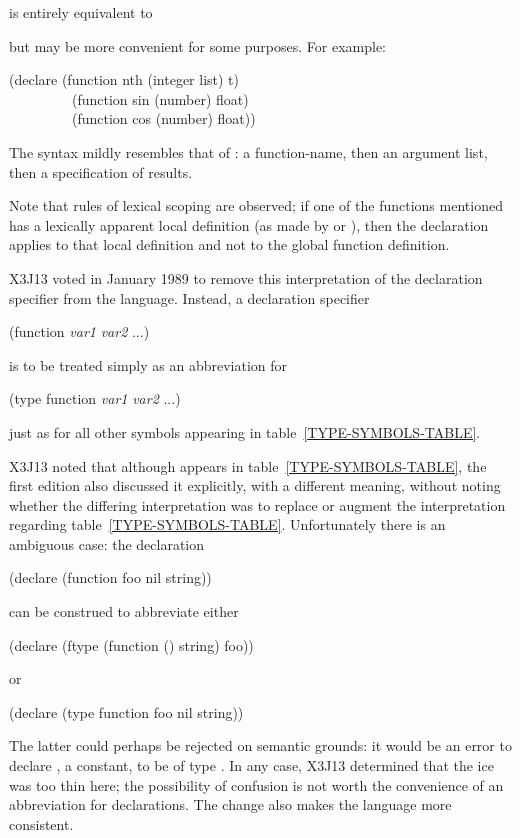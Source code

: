 \begin{obsolete}
\begin{flushdesc}
\item[\cd{function}]
is entirely equivalent to
\begin{lisp}
\end{lisp}
but may be more convenient for some purposes.
For example:
\begin{lisp}
(declare (function nth (integer list) t) \\
~~~~~~~~~(function sin (number) float) \\
~~~~~~~~~(function cos (number) float))
\end{lisp}
The syntax mildly resembles that of : a function-name,
then an argument list, then a specification of results.

Note that rules of lexical scoping are observed; if one of the functions
mentioned has a lexically apparent local definition
(as made by  or ), then the declaration
applies to that local definition and not to the global function definition.
\end{flushdesc}
\end{obsolete}

\begin{new}
X3J13 voted in January 1989
to remove this interpretation
of the  declaration specifier from the language.
Instead, a declaration specifier
\begin{lisp}
(function {\it var1} {\it var2} ...)
\end{lisp}
is to be treated simply as an abbreviation for
\begin{lisp}
(type function {\it var1} {\it var2} ...)
\end{lisp}
just as for all other symbols appearing in table~\ref{TYPE-SYMBOLS-TABLE}.

X3J13 noted that although  appears in
table~\ref{TYPE-SYMBOLS-TABLE}, the first edition also discussed it
explicitly, with a different meaning,
without noting whether the differing
interpretation was to replace or augment the
interpretation regarding table~\ref{TYPE-SYMBOLS-TABLE}.  Unfortunately
there is an ambiguous case: the declaration
\begin{lisp}
(declare (function foo nil string))
\end{lisp}
can be construed to abbreviate either
\begin{lisp}
(declare (ftype (function () string) foo))
\end{lisp}
or
\begin{lisp}
(declare (type function foo nil string))
\end{lisp}
The latter could perhaps be rejected on semantic grounds: it would be an
error to declare , a constant, to be of type .
In any case, X3J13 determined that the ice was too thin here;
the possibility of confusion is not worth the convenience of
an abbreviation for  declarations.
The change also makes the language more consistent.
\end{new}

